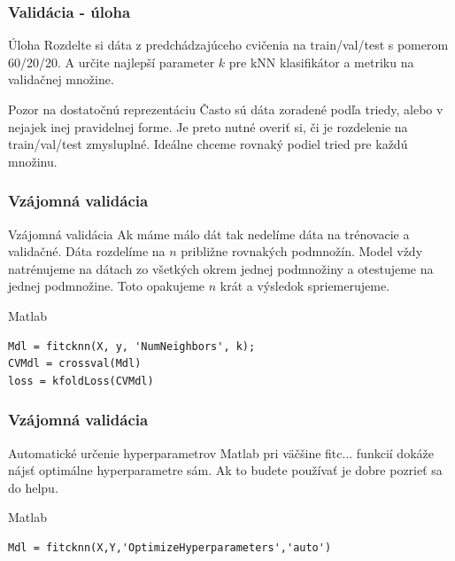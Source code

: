 \documentclass{beamer}
\begin{document}
\begin{frame}
\frametitle{Validácia - úloha}
\begin{block}{Úloha}
Rozdelte si dáta z predchádzajúceho cvičenia na train/val/test s pomerom 60/20/20. A určite najlepší parameter $k$ pre kNN klasifikátor a metriku na validačnej množine.
\end{block}

\begin{block}{Pozor na dostatočnú reprezentáciu}
Často sú dáta zoradené podľa triedy, alebo v nejajek inej pravidelnej forme. Je preto nutné overiť si, či je rozdelenie na train/val/test zmysluplné. Ideálne chceme rovnaký podiel tried pre každú množinu. 
\end{block}
\end{frame}

\begin{frame}[fragile]
\frametitle{Vzájomná validácia}
\begin{block}{Vzájomná validácia}
Ak máme málo dát tak nedelíme dáta na trénovacie a validačné. Dáta rozdelíme na $n$ približne rovnakých podmnožín. Model vždy natrénujeme na dátach zo všetkých okrem jednej podmnožiny a otestujeme na jednej podmnožine. Toto opakujeme $n$ krát a výsledok spriemerujeme.
\end{block}

\begin{block}{Matlab}
\begin{verbatim}
Mdl = fitcknn(X, y, 'NumNeighbors', k);
CVMdl = crossval(Mdl)
loss = kfoldLoss(CVMdl) \end{verbatim}
\end{block}
\end{frame}



\begin{frame}[fragile]
\frametitle{Vzájomná validácia}
\begin{block}{Automatické určenie hyperparametrov}
Matlab pri väčšine fitc... funkcií dokáže nájsť optimálne hyperparametre sám. Ak to budete používať je dobre pozrieť sa do helpu.
\end{block}

\begin{block}{Matlab}
\begin{verbatim}
Mdl = fitcknn(X,Y,'OptimizeHyperparameters','auto')\end{verbatim}
\end{block}
\end{frame}
\end{document}
